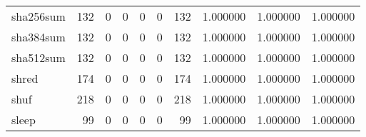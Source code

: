 \begin{tabular}{lrrrrrrrrr}
sha256sum &                                                132 &                                                  0 &                                                  0 &                                                  0 &                                                  0 &                                                132 &                                           1.000000 &                               1.000000 &                             1.000000 \\
sha384sum &                                                132 &                                                  0 &                                                  0 &                                                  0 &                                                  0 &                                                132 &                                           1.000000 &                               1.000000 &                             1.000000 \\
sha512sum &                                                132 &                                                  0 &                                                  0 &                                                  0 &                                                  0 &                                                132 &                                           1.000000 &                               1.000000 &                             1.000000 \\
shred     &                                                174 &                                                  0 &                                                  0 &                                                  0 &                                                  0 &                                                174 &                                           1.000000 &                               1.000000 &                             1.000000 \\
shuf      &                                                218 &                                                  0 &                                                  0 &                                                  0 &                                                  0 &                                                218 &                                           1.000000 &                               1.000000 &                             1.000000 \\
sleep     &                                                 99 &                                                  0 &                                                  0 &                                                  0 &                                                  0 &                                                 99 &                                           1.000000 &                               1.000000 &                             1.000000 \\

\end{tabular}
